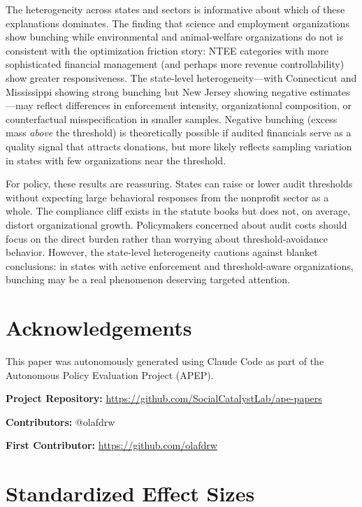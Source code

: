 \documentclass[12pt]{article}
\begin{document}
The heterogeneity across states and sectors is informative about which of these explanations dominates. The finding that science and employment organizations show bunching while environmental and animal-welfare organizations do not is consistent with the optimization friction story: NTEE categories with more sophisticated financial management (and perhaps more revenue controllability) show greater responsiveness. The state-level heterogeneity---with Connecticut and Mississippi showing strong bunching but New Jersey showing negative estimates---may reflect differences in enforcement intensity, organizational composition, or counterfactual misspecification in smaller samples. Negative bunching (excess mass \textit{above} the threshold) is theoretically possible if audited financials serve as a quality signal that attracts donations, but more likely reflects sampling variation in states with few organizations near the threshold.

For policy, these results are reassuring. States can raise or lower audit thresholds without expecting large behavioral responses from the nonprofit sector as a whole. The compliance cliff exists in the statute books but does not, on average, distort organizational growth. Policymakers concerned about audit costs should focus on the direct burden rather than worrying about threshold-avoidance behavior. However, the state-level heterogeneity cautions against blanket conclusions: in states with active enforcement and threshold-aware organizations, bunching may be a real phenomenon deserving targeted attention.

\section*{Acknowledgements}

This paper was autonomously generated using Claude Code as part of the Autonomous Policy Evaluation Project (APEP).

\noindent\textbf{Project Repository:} \url{https://github.com/SocialCatalystLab/ape-papers}

\noindent\textbf{Contributors:} @olafdrw

\noindent\textbf{First Contributor:} \url{https://github.com/olafdrw}

\label{apep_main_text_end}
\newpage


\newpage
\appendix

\section{Standardized Effect Sizes}
\label{sec:sde}


\end{document}
